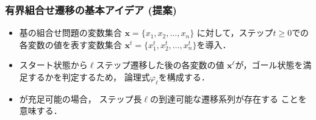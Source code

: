 \begin{frame}
  \frametitle{有界組合せ遷移の基本アイデア (提案)}
  \begin{itemize}
  \item 基の組合せ問題の変数集合
    $\bm{x} = \{x_1,x_2,\ldots,x_n\}$
    に対して，ステップ$t\geq 0$での各変数の値を表す変数集合
    $\bm{x}^{t} = \{x_1^t,x_2^t,\ldots,x_n^t\}$を導入．
  \item スタート状態から$\ell$ステップ遷移した後の各変数の値
    $\bm{x}^{\ell}$が，ゴール状態を満足するかを判定するため，
    論理式$\varphi_{\ell}$を構成する．
  \end{itemize}
  \begin{itemize}
  \item \bm{$\varphi_{\ell}$}が充足可能の場合，
    ステップ長$\ell$の到達可能な遷移系列が存在する
    ことを意味する．
  \end{itemize}
\end{frame}
